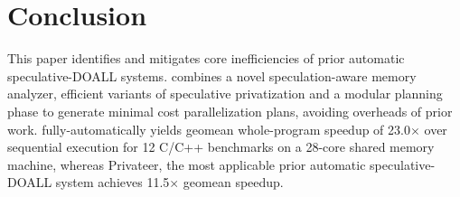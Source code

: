 \section{Conclusion}

This paper identifies and mitigates core inefficiencies of prior
automatic speculative-DOALL systems. \name combines a novel
speculation-aware memory analyzer, efficient variants of speculative
privatization and a modular planning phase to generate minimal cost
parallelization plans, avoiding overheads of prior work.
%
\name fully-automatically yields geomean whole-program speedup of
23.0$\times$ over sequential execution for 12 C/C++ benchmarks on a
28-core shared memory machine, whereas Privateer, the most applicable
prior automatic speculative-DOALL system achieves 11.5$\times$ geomean
speedup.
